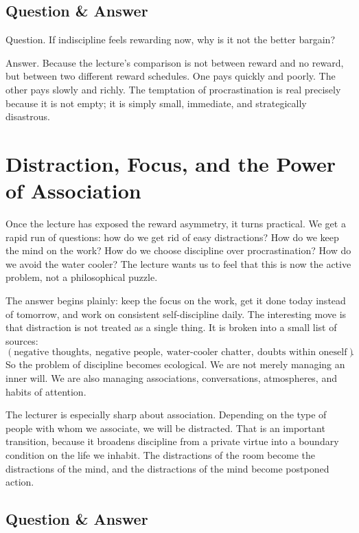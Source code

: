 \subsection{Question \& Answer}

Question. If indiscipline feels rewarding now, why is it not the better bargain?

Answer. Because the lecture's comparison is not between reward and no reward, but between two different reward schedules. One pays quickly and poorly. The other pays slowly and richly. The temptation of procrastination is real precisely because it is not empty; it is simply small, immediate, and strategically disastrous.

\section{Distraction, Focus, and the Power of Association}

Once the lecture has exposed the reward asymmetry, it turns practical. We get a rapid run of questions: how do we get rid of easy distractions? How do we keep the mind on the work? How do we choose discipline over procrastination? How do we avoid the water cooler? The lecture wants us to feel that this is now the active problem, not a philosophical puzzle.

The answer begins plainly: keep the focus on the work, get it done today instead of tomorrow, and work on consistent self-discipline daily. The interesting move is that distraction is not treated as a single thing. It is broken into a small list of sources:
\begin{equation}
(\text{negative thoughts},\ \text{negative people},\ \text{water-cooler chatter},\ \text{doubts within oneself}).
\end{equation}
So the problem of discipline becomes ecological. We are not merely managing an inner will. We are also managing associations, conversations, atmospheres, and habits of attention.

The lecturer is especially sharp about association. Depending on the type of people with whom we associate, we will be distracted. That is an important transition, because it broadens discipline from a private virtue into a boundary condition on the life we inhabit. The distractions of the room become the distractions of the mind, and the distractions of the mind become postponed action.

\subsection{Question \& Answer}

